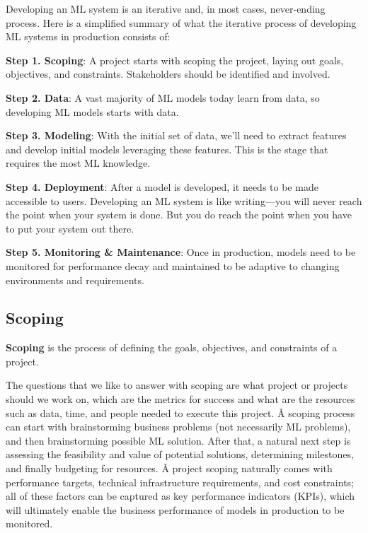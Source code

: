 Developing an ML system is an iterative and, in most cases, never-ending process. Here is a simplified summary of what
the iterative process of developing ML systems in production consists of:
\bit
\item \textbf{Step 1. Scoping}: A project starts with scoping the project, laying out goals, objectives, and constraints.
Stakeholders should be identified and involved.
\item \textbf{Step 2. Data}: A vast majority of ML models today learn from data, so developing ML models starts with
data.
\item \textbf{Step 3. Modeling}: With the initial set of data, we'll need to extract features and develop initial models
leveraging these features. This is the stage that requires the most ML knowledge.
\item \textbf{Step 4. Deployment}: After a model is developed, it needs to be made accessible to users. Developing an ML
system is like writing—you will never reach the point when your system is done. But you do reach the point when you have
to put your system out there.
\item \textbf{Step 5. Monitoring \& Maintenance}: Once in production, models need to be monitored for performance decay
and maintained to be adaptive to changing environments and requirements.
\eit


\subsection{Scoping}

\bd[Scoping]
\textbf{Scoping} is the process of defining the goals, objectives, and constraints of a project.
\ed

The questions that we like to answer with scoping are what project or projects should we work on, which are the
metrics for success and what are the resources such as data, time, and people needed to execute this project. \v

A scoping process can start with brainstorming business problems (not necessarily ML problems), and then
brainstorming possible ML solution. After that, a natural next step is assessing the feasibility and value of
potential solutions, determining milestones, and finally budgeting for resources. \v

A project scoping naturally comes with performance targets, technical infrastructure requirements, and cost
constraints; all of these factors can be captured as key performance indicators (KPIs), which will ultimately enable
the business performance of models in production to be monitored.

